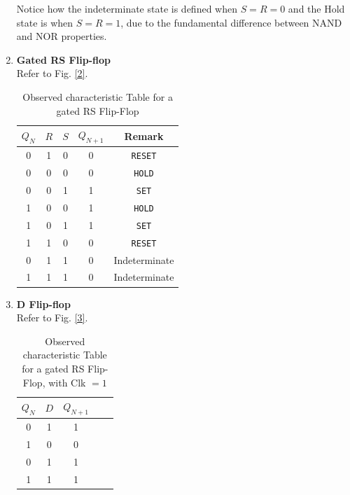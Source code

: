 \begin{enumerate}
    \noindent Notice how the indeterminate state is defined when $S=R=0$ and the Hold state is when $S=R=1$, due to the fundamental difference between NAND and NOR properties.\\

    \item \textbf{Gated RS Flip-flop}\\
    Refer to Fig. \ref{2}.
    \begin{table}[H]
        \centering
        \begin{tabular}{|c|c|c|c|c|}\hline
            $Q_N$ & $R$ & $S$ & $Q_{N+1}$ & Remark \\ \hline
            0 & 1 & 0 & 0 & \verb|RESET| \\ 
            0 & 0 & 0 & 0 & \verb|HOLD|\\ 
            0 & 0 & 1 & 1 & \verb|SET|\\ 
            1 & 0 & 0 & 1 & \verb|HOLD| \\ 
            1 & 0 & 1 & 1 & \verb|SET| \\ 
            1 & 1 & 0 & 0 & \verb|RESET|\\ 
            0 & 1 & 1 & 0 & Indeterminate\\ 
            1 & 1 & 1 & 0 & Indeterminate\\\hline
        \end{tabular}
        \caption{Observed characteristic Table for a gated RS Flip-Flop}
    \end{table}

    \item \textbf{D Flip-flop}\\
    Refer to Fig. \ref{3}.
    \begin{table}[H]
        \centering
        \begin{tabular}{|c|c|c|c|c|}\hline
            $Q_N$ & $D$ & $Q_{N+1}$ \\ \hline
            0 & 1 & 1 \\ 
            1 & 0 & 0 \\ 
            0 & 1 & 1 \\ 
            1 & 1 & 1 \\ \hline
        \end{tabular}
        \caption{Observed characteristic Table for a gated RS Flip-Flop, with Clk $=1$}
    \end{table}


\end{enumerate}
